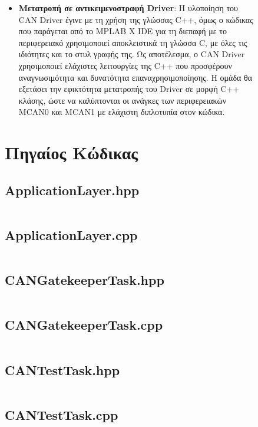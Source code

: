 \documentclass[a4paper,nobib,justified]{tufte-book}
\begin{document}
\begin{figure}
\begin{fullwidth}
\begin{itemize}
		\item \textbf{Μετατροπή σε αντικειμενοστραφή Driver}: Η υλοποίηση του CAN Driver έγινε με τη χρήση της γλώσσας C++, όμως ο κώδικας που παράγεται από το MPLAB X IDE για τη διεπαφή με το περιφερειακό χρησιμοποιεί αποκλειστικά τη γλώσσα C, με όλες τις ιδιότητες και το στυλ γραφής της. Ως αποτέλεσμα, ο CAN Driver χρησιμοποιεί ελάχιστες λειτουργίες της C++ που προσφέρουν αναγνωσιμότητα και δυνατότητα επαναχρησιμοποίησης. Η ομάδα θα εξετάσει την εφικτότητα μετατροπής του Driver σε μορφή C++ κλάσης, ώστε να καλύπτονται οι ανάγκες των περιφερειακών MCAN0 και MCAN1 με ελάχιστη διπλοτυπία στον κώδικα.
	\end{itemize}
\end{fullwidth}

\appendix

\begin{fullwidth}
\bgroup
\printbibliography[heading=bibnumbered,title={Βιβλιογραφία}]
\egroup
\end{fullwidth}

\chapter{Πηγαίος Κώδικας}

\section*{ApplicationLayer.hpp}
\inputminted{cpp}{code/full-files/ApplicationLayer.hpp}
\newpage
\section*{ApplicationLayer.cpp}
\inputminted{cpp}{code/full-files/ApplicationLayer.cpp}
\newpage
\section*{CANGatekeeperTask.hpp}
\inputminted{cpp}{code/full-files/CANGatekeeperTask.hpp}
\newpage
\section*{CANGatekeeperTask.cpp}
\inputminted{cpp}{code/full-files/CANGatekeeperTask.cpp}
\newpage
\section*{CANTestTask.hpp}
\inputminted{cpp}{code/full-files/CANTestTask.hpp}
\newpage
\section*{CANTestTask.cpp}
\inputminted{cpp}{code/full-files/CANTestTask.cpp}
\newpage

\end{figure}
\end{document}
